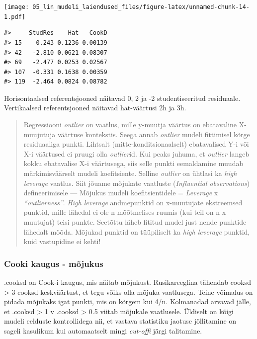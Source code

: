 \documentclass[]{book}
\begin{document}
\texttt{[image: 05\_lin\_mudeli\_laiendused\_files/figure-latex/unnamed-chunk-14-1.pdf]}

\begin{verbatim}
#>     StudRes    Hat   CookD
#> 15   -0.243 0.1236 0.00139
#> 42   -2.810 0.0621 0.08307
#> 69   -2.477 0.0253 0.02567
#> 107  -0.331 0.1638 0.00359
#> 119  -2.464 0.0824 0.08782
\end{verbatim}

Horisontaalsed referentsjooned näitavad 0, 2 ja -2 studentiseeritud
residuaale. Vertikaalsed referentsjooned näitavad hat-väärtusi 2h ja 3h.

\begin{quote}
Regressiooni \emph{outlier} on vaatlus, mille y-muutja väärtus on
ebatavaline X-muujutuja väärtuse kontekstis. Seega annab \emph{outlier}
mudeli fittimisel kõrge residuaaliga punkti. Lihtsalt
(mitte-konditsionaalselt) ebatavalised Y-i või X-i väärtused ei pruugi
olla \emph{outlier}id. Kui peaks juhuma, et \emph{outlier} langeb kokku
ebatavalise X-i väärtusega, siis selle punkti eemaldamine muudab
märkimisväärselt mudeli koefitsiente. Selline \emph{outlier} on ühtlasi
ka \emph{high leverage} vaatlus. Siit jõuame mõjukate vaatluste
(\emph{Influential observations}) defineerimisele --- Mõjukus mudeli
koefitsientidele = \emph{Leverage} x \emph{``outlierness''}. \emph{High
leverage} andmepunktid on x-muutujate ekstreemsed punktid, mille lähedal
ei ole n-mõõtmelises ruumis (kui teil on n x-muutujat) teisi punkte.
Seetõttu läheb fititud mudel just nende punktide lähedalt mõõda. Mõjukad
punktid on tüüpiliselt ka \emph{high leverage} punktid, kuid vastupidine
ei kehti!
\end{quote}

\subsubsection*{Cooki kaugus - mõjukus}\label{cooki-kaugus---mojukus}

.cooksd on Cook-i kaugus, mis näitab mõjukust. Rusikareeglina tähendab
cooksd \textgreater{} 3 cooksd keskväärtust, et tegu võiks olla mõjuka
vaatlusega. Teine võimalus on pidada mõjukaks igat punkti, mis on kõrgem
kui 4/n. Kolmanadad arvavad jälle, et .cooksd \textgreater{} 1 v .cooksd
\textgreater{} 0.5 viitab mõjukale vaatlusele. Üldiselt on kõigi mudeli
eelduste kontrollidega nii, et vastava statistiku jaotuse jõllitamine on
sageli kasulikum kui automaatselt mingi \emph{cut-offi} järgi
talitamine.
\end{document}
